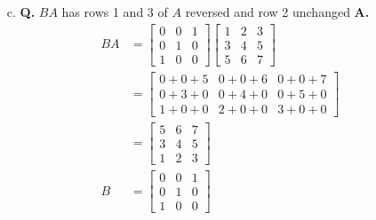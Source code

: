 \documentclass[main.tex]{subfiles}
\begin{document}
\begin{enumerate}
\begin{enumerate}
        \item [c.] \textbf{Q.} $B A$ has rows 1 and 3 of $A$ reversed and row 2 unchanged \textbf{A.}
        $$
        \begin{aligned}
        B A &=\left[\begin{array}{lll}
        0 & 0 & 1 \\
        0 & 1 & 0 \\
        1 & 0 & 0
        \end{array}\right]\left[\begin{array}{lll}
        1 & 2 & 3 \\
        3 & 4 & 5 \\
        5 & 6 & 7
        \end{array}\right] \\
        &=\left[\begin{array}{lll}
        0+0+5 & 0+0+6 & 0+0+7 \\
        0+3+0 & 0+4+0 & 0+5+0 \\
        1+0+0 & 2+0+0 & 3+0+0
        \end{array}\right] \\
        &=\left[\begin{array}{lll}
        5 & 6 & 7 \\
        3 & 4 & 5 \\
        1 & 2 & 3
        \end{array}\right]\\
        B &= \left[\begin{array}{lll}
        0 & 0 & 1 \\
        0 & 1 & 0 \\
        1 & 0 & 0
        \end{array}\right]
        \end{aligned}
        $$
        

\end{enumerate}
\end{enumerate}
\end{document}

